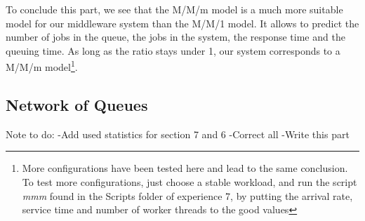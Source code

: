 \documentclass[11pt,a4paper]{article}
\begin{document}
To conclude this part, we see that the M/M/m model is a much more suitable model for our middleware system than the M/M/1 model. It allows to predict the number of jobs in the queue, the jobs in the system, the response time and the queuing time. As long as the ratio stays under 1, our system corresponds to a M/M/m model\footnote{More configurations have been tested here and lead to the same conclusion. To test more configurations, just choose a stable workload, and run the script \textit{mmm} found in the Scripts folder of experience 7, by putting the arrival rate, service time and number of worker threads to the good values}.  

\newpage
\subsection{Network of Queues}
Note to do: 
-Add used statistics for section 7 and 6
-Correct all
-Write this part
\end{document}
